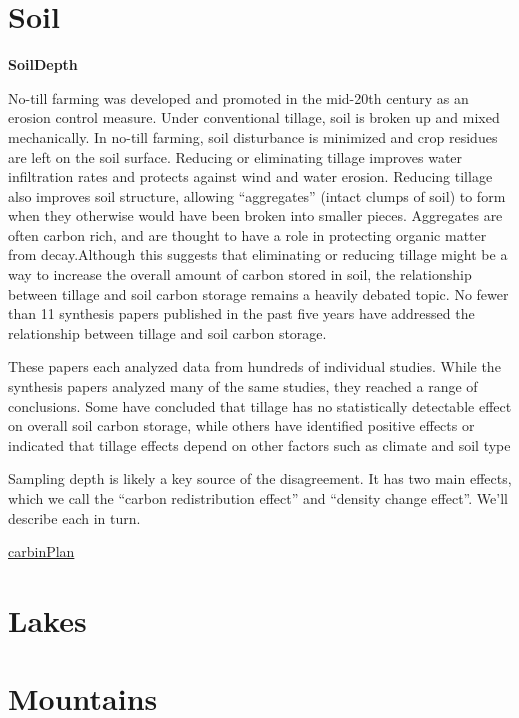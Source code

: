 \documentclass[
]{book}
\begin{document}
\hypertarget{soil}{%
\section{Soil}\label{soil}}

\textbf{SoilDepth}

No-till farming was developed and promoted in the mid-20th century as an erosion control measure. Under conventional tillage, soil is broken up and mixed mechanically. In no-till farming, soil disturbance is minimized and crop residues are left on the soil surface. Reducing or eliminating tillage improves water infiltration rates and protects against wind and water erosion. Reducing tillage also improves soil structure, allowing ``aggregates'' (intact clumps of soil) to form when they otherwise would have been broken into smaller pieces. Aggregates are often carbon rich, and are thought to have a role in protecting organic matter from decay.Although this suggests that eliminating or reducing tillage might be a way to increase the overall amount of carbon stored in soil, the relationship between tillage and soil carbon storage remains a heavily debated topic. No fewer than 11 synthesis papers published in the past five years have addressed the relationship between tillage and soil carbon storage.

These papers each analyzed data from hundreds of individual studies. While the synthesis papers analyzed many of the same studies, they reached a range of conclusions. Some have concluded that tillage has no statistically detectable effect on overall soil carbon storage, while others have identified positive effects or indicated that tillage effects depend on other factors such as climate and soil type

Sampling depth is likely a key source of the disagreement. It has two main effects, which we call the ``carbon redistribution effect'' and ``density change effect''. We'll describe each in turn.

\href{https://carbonplan.org/research/soil-depth-sampling}{carbinPlan}

\hypertarget{lakes}{%
\section{Lakes}\label{lakes}}

\hypertarget{mountains}{%
\section{Mountains}\label{mountains}}
\end{document}
